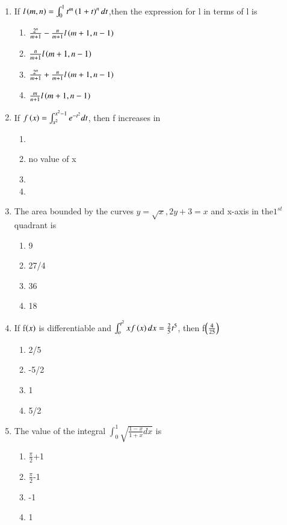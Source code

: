 \documentclass[journal,12pt,twocolumn]{IEEEtran}
\theoremstyle{remark}
\begin{document}
\begin{enumerate}
   \item If $l\left(m,n\right)=\int_{0}^{1} t^{m}\left(1+t\right)^{n} dt$,then the expression for l in terms of l is
\begin{enumerate}
 \item $\frac{2^{n}}{m+1} -\frac{n}{m+1}l\left(m+1,n-1\right)$
 \item $\frac{n}{m+1}l\left(m+1,n-1\right)$
 \item$ \frac{2^{n}}{m+1}+\frac{n}{m+1}l\left(m+1,n-1\right)$
 \item $\frac{m}{n+1}l\left(m+1,n-1\right)$
\end{enumerate}
\item If $f\left(x\right)=\int_{x^{2}}^{x^{2}-1} e^{-t^{2}}dt$, then f increases in
\begin{enumerate}
    \item {}
    \item no value of x
    \item {}
    \item {}
    \hfill{}
\end{enumerate}
  \item The area bounded by the curves $ y=\sqrt{x},2y+3=x$  and x-axis in the$ 1^{st}$ quadrant is
\begin{enumerate}
    \item 9
    \item 27/4
    \item 36
    \item 18
    \hfill{}
\end{enumerate}
 \item If f$\left(x\right)$ is differentiable and $\int_{o}^{t^{2}}xf\left(x\right)dx=\frac{2}{5}t^{5}$, then f$\left(\frac{4}{25}\right)$
 \begin{enumerate}
     \item 2/5
     \item -5/2
     \item 1
     \item 5/2
     \hfill{}
 \end{enumerate}
 \item The value of the integral $\int_{0}^{1}\sqrt{\frac{1-x}{1+x}dx}$ is
\begin{enumerate}
 \item $\frac{\pi}{2}$+1
 \item $\frac{\pi}{2}$-1
 \item -1
 \item 1
 \hfill{}
 \end{enumerate}

\end{enumerate}
\end{document}
